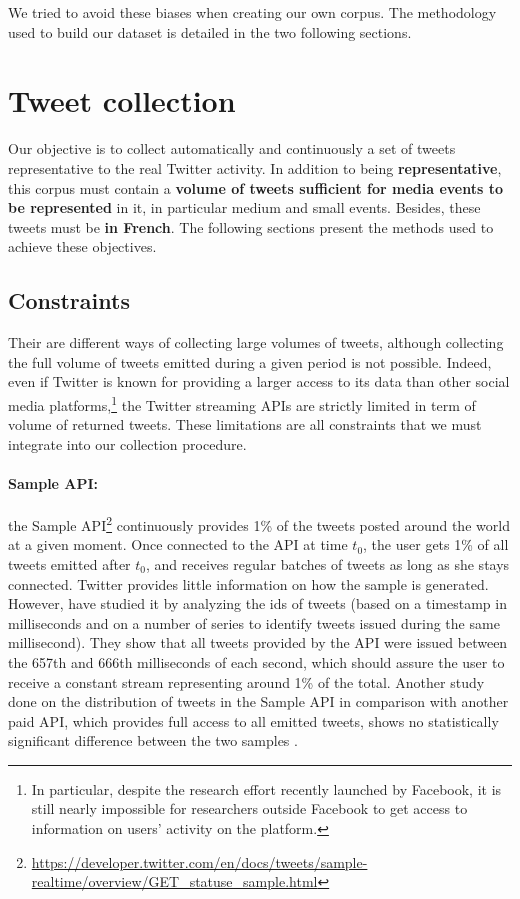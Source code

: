 We tried to avoid these biases when creating our own corpus. The methodology used to build our dataset is detailed in the two following sections.

\section{Tweet collection}
Our objective is to collect automatically and continuously a set of tweets representative to the real Twitter activity. In addition to being \textbf{representative}, this corpus must contain a \textbf{volume of tweets sufficient for media events to be represented} in it, in particular medium and small events. Besides, these tweets must be \textbf{in French}. The following sections present the methods used to achieve these objectives.
\subsection{Constraints}
Their are different ways of collecting large volumes of tweets, although collecting the full volume of tweets emitted during a given period is not possible. Indeed, even if Twitter is known for providing a larger access to its data than other social media platforms,\footnote{In particular, despite the research effort recently launched by Facebook, it is still nearly impossible for researchers outside Facebook to get access to information on users' activity on the platform.} the Twitter streaming APIs are strictly limited in term of volume of returned tweets. These limitations are all constraints that we must integrate into our collection procedure.
	
	


\paragraph{Sample API:}

the Sample API\footnote{\url{https://developer.twitter.com/en/docs/tweets/sample-realtime/overview/GET_statuse_sample.html}} continuously provides 1\% of the tweets posted around the world at a given moment. Once connected to the API at time $t_0$, the user gets 1\% of all tweets emitted after $t_0$, and receives regular batches of tweets as long as she stays connected. Twitter provides little information on how the sample is generated. However,  \citet{kergl_endogenesis_2014} have studied it by analyzing the ids of tweets (based on a timestamp in milliseconds and on a number of series to identify tweets issued during the same millisecond). They show that all tweets provided by the API were issued between the 657th and 666th milliseconds of each second, which should assure the user to receive a constant stream representing around 1\% of the total. Another study done on the distribution of tweets in the Sample API in comparison with another paid API, which provides full access to all emitted tweets, shows no statistically significant difference between the two samples \citep{morstatter_when_2014}.


